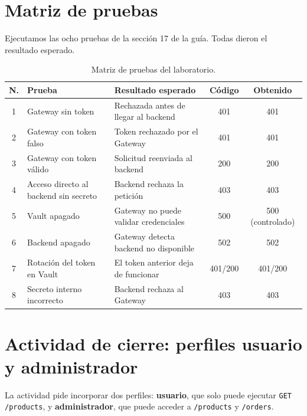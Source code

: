 \documentclass[11pt,a4paper]{article}
\begin{document}
\section{Matriz de pruebas}

Ejecutamos las ocho pruebas de la sección 17 de la guía. Todas dieron el resultado esperado.

\begin{table}[h]
\centering
\small
\begin{tabular}{@{}cp{4.2cm}p{5.2cm}cc@{}}
\toprule
\textbf{N.} & \textbf{Prueba} & \textbf{Resultado esperado} & \textbf{Código} & \textbf{Obtenido} \\
\midrule
1 & Gateway sin token & Rechazada antes de llegar al backend & 401 & 401 \\
2 & Gateway con token falso & Token rechazado por el Gateway & 401 & 401 \\
3 & Gateway con token válido & Solicitud reenviada al backend & 200 & 200 \\
4 & Acceso directo al backend sin secreto & Backend rechaza la petición & 403 & 403 \\
5 & Vault apagado & Gateway no puede validar credenciales & 500 & 500 (controlado) \\
6 & Backend apagado & Gateway detecta backend no disponible & 502 & 502 \\
7 & Rotación del token en Vault & El token anterior deja de funcionar & 401/200 & 401/200 \\
8 & Secreto interno incorrecto & Backend rechaza al Gateway & 403 & 403 \\
\bottomrule
\end{tabular}
\caption{Matriz de pruebas del laboratorio.}
\end{table}

\section{Actividad de cierre: perfiles usuario y administrador}

La actividad pide incorporar dos perfiles: \textbf{usuario}, que solo puede ejecutar \texttt{GET /products}, y \textbf{administrador}, que puede acceder a \texttt{/products} y \texttt{/orders}.
\end{document}
